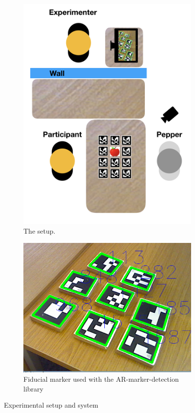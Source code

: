 \documentclass[letterpaper]{article} %
\begin{document}
\begin{figure}
    \centering
    \begin{subfigure}[b]{0.27\textwidth}
        \includegraphics[width=\textwidth]{Picture4.png}
        \caption{The setup.}
        \label{pic2}
    \end{subfigure}
    \begin{subfigure}[b]{0.12\textwidth}
        \includegraphics[width=\textwidth]{Picture3.png}
        \caption{Fiducial marker used with the AR-marker-detection library}
        \label{pic3}
    \end{subfigure}
    \caption{Experimental setup and system}\label{fig:animals}
\end{figure}
\end{document}
